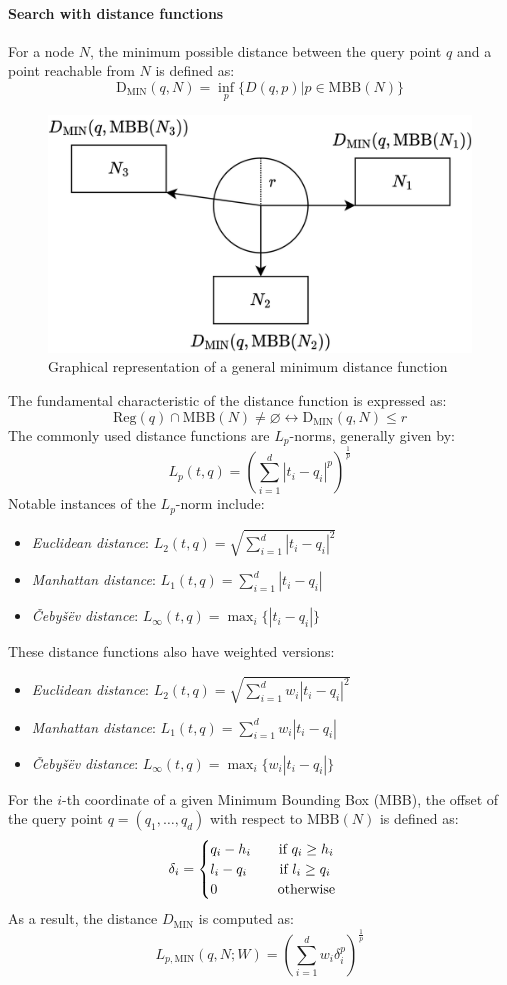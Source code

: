\paragraph*{Search with distance functions}
For a node $N$, the minimum possible distance between the query point $q$ and a point reachable from $N$ is defined as:
\[\text{D}_{\text{MIN}}(q,N)=\inf_p\{D(q,p)|p \in \text{MBB}(N)\}\]
\begin{figure}[H]
    \centering
    \includegraphics[width=0.5\linewidth]{images/d.png}
    \caption{Graphical representation of a general minimum distance function}
\end{figure}
The fundamental characteristic of the distance function is expressed as:
\[\text{Reg}(q) \cap \text{MBB}(N) \neq \varnothing \leftrightarrow \text{D}_{\text{MIN}}(q,N) \leq r\]
The commonly used distance functions are $L_p$-norms, generally given by:
\[L_p(t,q)=\left( \sum_{i=1}^d \left\lvert t_i-q_i \right\rvert^p  \right)^{\frac{1}{p}}\]
Notable instances of the $L_p$-norm include:
\begin{itemize}
    \item \textit{Euclidean distance}: $L_2(t,q)=\sqrt{\sum_{i=1}^{d}{\left\lvert t_i-q_i \right\rvert^{2}}}$
    \item \textit{Manhattan distance}: $L_1(t,q)=\sum_{i=1}^{d}{\left\lvert t_i-q_i \right\rvert}$
    \item \textit{Čebyšëv distance}: $L_{\infty}(t,q)=\max_{i}\{\left\lvert t_i-q_i\right\rvert\}$
\end{itemize}
These distance functions also have weighted versions:
\begin{itemize}
    \item \textit{Euclidean distance}: $L_2(t,q)=\sqrt{\sum_{i=1}^{d}{w_i\left\lvert t_i-q_i \right\rvert^{2}}}$
    \item \textit{Manhattan distance}: $L_1(t,q)=\sum_{i=1}^{d}{w_i\left\lvert t_i-q_i \right\rvert}$
    \item \textit{Čebyšëv distance}: $L_{\infty}(t,q)=\max_{i}\{w_i\left\lvert t_i-q_i\right\rvert\}$
\end{itemize}
For the $i$-th coordinate of a given Minimum Bounding Box (MBB), the offset of the query point $q=(q_1,\dots,q_d)$ with respect to $\text{MBB}(N)$ is defined as:
\[ \delta_i=\begin{cases}
    q_i-h_i \qquad \textnormal{if } q_i \geq h_i \\
    l_i-q_i \qquad \textnormal{ if } l_i \geq q_i \\
    0 \qquad\qquad \textnormal{  otherwise}
\end{cases}\]
As a result, the distance $D_{\text{MIN}}$ is computed as:
\[L_{p,\text{MIN}}(q,N;W)=\left( \sum_{i=1}^d{w_i\delta_i^p} \right)^{\frac{1}{p}}\]


